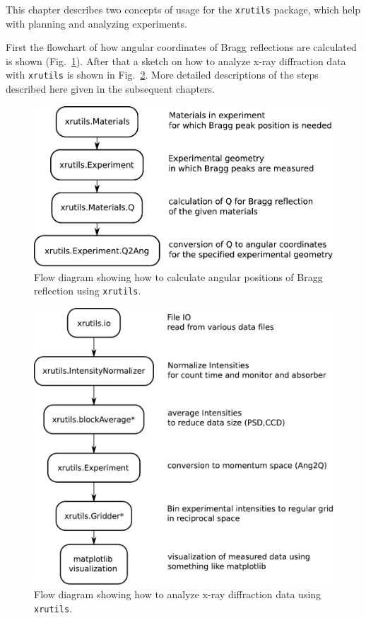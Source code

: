 
This chapter describes two concepts of usage for the {\tt xrutils} package, which help with planning and analyzing experiments.

First the flowchart of how angular coordinates of Bragg reflections are calculated is shown (Fig.~\ref{fig:xrutils_usage_planning}). After that a sketch on how to analyze x-ray diffraction data with {\tt xrutils} is shown in Fig.~\ref{fig:xrutils_usage}. More detailed descriptions of the steps described here given in the subsequent chapters.

\begin{figure}[H]
 \centering
 \includegraphics[width=0.8\linewidth]{pics/xrutils_usage_planning}
 \caption{Flow diagram showing how to calculate angular positions of Bragg reflection using {\tt xrutils}.}
 \label{fig:xrutils_usage_planning}
\end{figure}
   
\begin{figure}[H]
 \centering
 \includegraphics[width=0.8\linewidth]{pics/xrutils_usage}
 \caption{Flow diagram showing how to analyze x-ray diffraction data using {\tt xrutils}.}
 \label{fig:xrutils_usage}
\end{figure}

